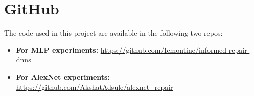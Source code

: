 \documentclass{article}
\begin{document}
\section{GitHub}

The code used in this project are available in the following two repos:
\begin{itemize}
	\item \textbf{For MLP experiments:} \url{https://github.com/Iemontine/informed-repair-dnns}
	\item \textbf{For AlexNet experiments:} \url{https://github.com/AkshatAdsule/alexnet_repair}
\end{itemize}

\newpage


\end{document}
